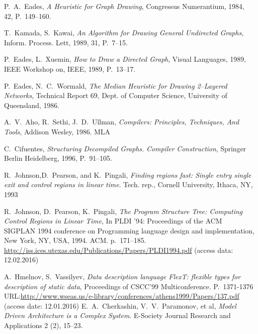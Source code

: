 \documentclass[conference]{IEEEtran}
\begin{document}
\begin{thebibliography}{9}
 P.~A.~Eades, \emph{A Heuristic for Graph Drawing}, Congressus Numerantium, 1984, 42,  P.~149--160.

 T.~Kamada, S.~Kawai, \emph{An Algorithm for Drawing General Undirected Graphs}, Inform. Process. Lett, 1989, 31, P.~7--15.

 P.~Eades, L.~Xuemin, \emph{How to Draw a Directed Graph}, Visual Languages, 1989, IEEE Workshop on, IEEE, 1989, P.~13--17.

 P.~Eades, N.~C.~Wormald, \emph{The Median Heuristic for Drawing 2--Layered Networks}, Technical Report 69, Dept. of Computer Science, University of Queensland, 1986.

 A.~V.~Aho, R.~Sethi, J.~D.~Ullman, \emph{Compilers: Principles, Techniques, And Tools}, Addison Wesley, 1986.  MLA

 C.~Cifuentes, \emph{Structuring Decompiled Graphs. Compiler Construction}, Springer Berlin Heidelberg, 1996, P.~91--105.

 R.~Johnson,D.~Pearson, and K.~Pingali, \emph{Finding regions fast: Single entry single exit and control regions in linear time}. Tech. rep., Cornell University, Ithaca, NY, 1993

 R.~Johnson, D.~Pearson, K.~Pingali, \emph{The Program Structure Tree: Computing Control Regions in Linear Time}, In PLDI '94: Proceedings of the ACM SIGPLAN 1994 conference on Programming language design and implementation, New York, NY, USA, 1994. ACM. p.~171--185. \url{http://iss.ices.utexas.edu/Publications/Papers/PLDI1994.pdf} (access data: 12.02.2016)

 A.~Hmelnov, S.~Vassilyev, \emph{Data description language FlexT: flexible types for description of static data}, Proceedings of CSCC'99 Multiconference. P.~1371-1376 URL:\url{http://www.wseas.us/e-library/conferences/athens1999/Papers/137.pdf} (access date: 12.01.2016)
 E.~A.~Cherkashin, V.~V.~Paramonov, et al, \emph{Model Driven Architecture is a Complex System}. E-Society Journal Research and Applications 2 (2), 15--23.



\end{thebibliography}




\end{document}

